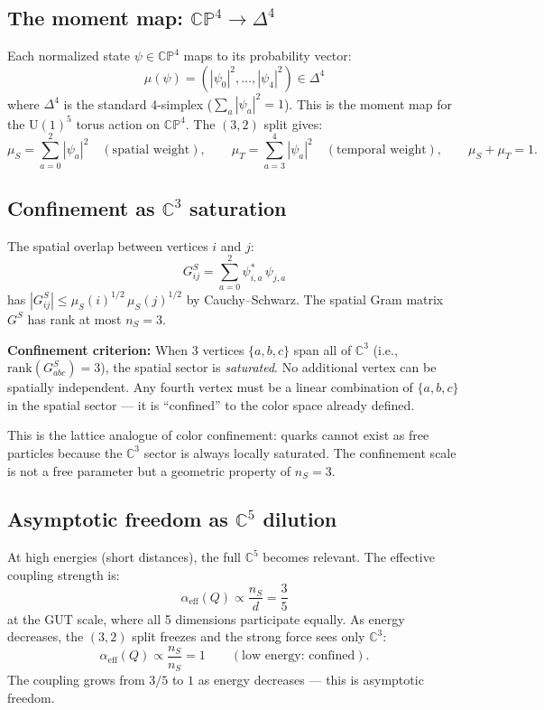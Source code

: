 \documentclass[12pt]{article}
\theoremstyle{remark}
\theoremstyle{definition}
\newcommand{\CC}{\mathbb{C}}
\begin{document}
\subsection{The moment map: $\mathbb{CP}^4 \to \Delta^4$}

Each normalized state $\psi \in \mathbb{CP}^4$ maps to its probability vector:
\begin{equation}
\mu(\psi) = (|\psi_0|^2, \ldots, |\psi_4|^2) \in \Delta^4
\end{equation}
where $\Delta^4$ is the standard 4-simplex ($\sum_a |\psi_a|^2 = 1$). This is the moment map for the $\text{U}(1)^5$ torus action on $\mathbb{CP}^4$. The $(3,2)$ split gives:
\begin{equation}
\mu_S = \sum_{a=0}^{2}|\psi_a|^2 \quad (\text{spatial weight}), \qquad \mu_T = \sum_{a=3}^{4}|\psi_a|^2 \quad (\text{temporal weight}), \qquad \mu_S + \mu_T = 1.
\end{equation}

\subsection{Confinement as $\CC^3$ saturation}

The spatial overlap between vertices $i$ and $j$:
\begin{equation}
G^S_{ij} = \sum_{a=0}^{2} \psi^*_{i,a}\,\psi_{j,a}
\end{equation}
has $|G^S_{ij}| \leq \mu_S(i)^{1/2}\,\mu_S(j)^{1/2}$ by Cauchy--Schwarz. The spatial Gram matrix $G^S$ has rank at most $n_S = 3$.

\textbf{Confinement criterion:} When 3 vertices $\{a, b, c\}$ span all of $\CC^3$ (i.e., $\text{rank}(G^S_{abc}) = 3$), the spatial sector is \emph{saturated}. No additional vertex can be spatially independent. Any fourth vertex must be a linear combination of $\{a, b, c\}$ in the spatial sector --- it is ``confined'' to the color space already defined.

This is the lattice analogue of color confinement: quarks cannot exist as free particles because the $\CC^3$ sector is always locally saturated. The confinement scale is not a free parameter but a geometric property of $n_S = 3$.

\subsection{Asymptotic freedom as $\CC^5$ dilution}

At high energies (short distances), the full $\CC^5$ becomes relevant. The effective coupling strength is:
\begin{equation}
\alpha_\text{eff}(Q) \propto \frac{n_S}{d} = \frac{3}{5}
\end{equation}
at the GUT scale, where all 5 dimensions participate equally. As energy decreases, the $(3,2)$ split freezes and the strong force sees only $\CC^3$:
\begin{equation}
\alpha_\text{eff}(Q) \propto \frac{n_S}{n_S} = 1 \qquad (\text{low energy: confined}).
\end{equation}
The coupling grows from $3/5$ to $1$ as energy decreases --- this is asymptotic freedom.
\end{document}
